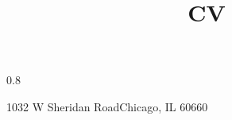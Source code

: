 \nopagenumbers{}

\usepackage[utf8]{inputenc}
\usepackage{fullpage}
\usepackage[maxbibnames=99,backend=biber,style=numeric,natbib=true]{biblatex}

\usepackage{xcolor}

\usepackage{import}

\usepackage{etoolbox,changepage}
\patchcmd{\makehead}%
  {0.8\textwidth}%
  {\linewidth}%
  {}{}%
  
\title{CV}
\address{Loyola University Chicago}{1032 W Sheridan Road}{Chicago, IL 60660}
